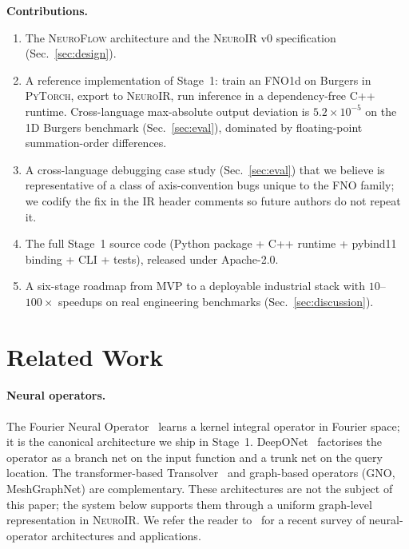 \documentclass[10pt,twocolumn]{article}
\newcommand{\nf}{\textsc{NeuroFlow}}
\newcommand{\neuroir}{\textsc{NeuroIR}}
\newcommand{\py}{\textsc{PyTorch}}
\begin{document}
\noindent\textbf{Contributions.}
\begin{enumerate}[leftmargin=*,itemsep=1pt,topsep=2pt]
  \item The \nf{} architecture and the \neuroir{} v0 specification
  (Sec.~\ref{sec:design}).
  \item A reference implementation of Stage~1: train an FNO1d on
  Burgers in \py{}, export to \neuroir{}, run inference in a
  dependency-free C{++} runtime.  Cross-language max-absolute output
  deviation is $5.2 \times 10^{-5}$ on the 1D Burgers benchmark
  (Sec.~\ref{sec:eval}), dominated by floating-point summation-order
  differences.
  \item A cross-language debugging case study (Sec.~\ref{sec:eval})
  that we believe is representative of a class of axis-convention
  bugs unique to the FNO family; we codify the fix in the IR header
  comments so future authors do not repeat it.
  \item The full Stage~1 source code (Python package + C{++} runtime
  + pybind11 binding + CLI + tests), released under Apache-2.0.
  \item A six-stage roadmap from MVP to a deployable industrial
  stack with $10$--$100\times$ speedups on real engineering
  benchmarks (Sec.~\ref{sec:discussion}).
\end{enumerate}

\section{Related Work}

\paragraph{Neural operators.}
The Fourier Neural Operator~\citep{li2021fno} learns a kernel
integral operator in Fourier space; it is the canonical architecture
we ship in Stage~1.  DeepONet~\citep{lu2021deeponet} factorises the
operator as a branch net on the input function and a trunk net on
the query location.  The transformer-based
Transolver~\cite{wu2024transolver} and graph-based operators (GNO,
MeshGraphNet) are complementary.  These architectures are not the
subject of this paper; the system below supports them through a
uniform graph-level representation in \neuroir{}.
%
We refer the reader to~\citep{kovachki2023neuraloperator} for a
recent survey of neural-operator architectures and
applications.
\end{document}
